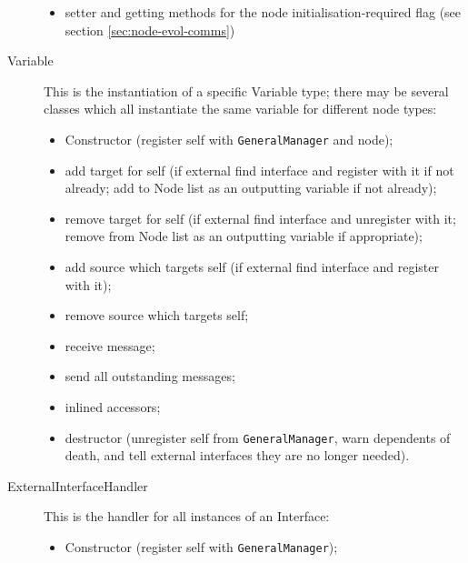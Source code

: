 \documentclass[pdftex,a4paper]{article}
\begin{document}
\begin{description}
\begin{itemize}
\item setter and getting methods for the node initialisation-required
  flag (see section \ref{sec:node-evol-comms})

\end{itemize}

\item[Variable] This is the instantiation of a specific Variable type;
there may be several classes which all instantiate the same variable
for different node types:

\begin{itemize}

\item Constructor (register self with {\tt GeneralManager} and node);

\item add target for self (if external find interface and register
  with it if not already; add to Node list as an outputting variable
  if not already);

\item remove target for self (if external find interface and
  unregister with it; remove from Node list as an outputting variable
  if appropriate);

\item add source which targets self (if external find interface and
  register with it);

\item remove source which targets self;

\item receive message;

\item send all outstanding messages;

\item inlined accessors;

\item destructor (unregister self from {\tt GeneralManager}, warn
  dependents of death, and tell external interfaces they are no longer
  needed).

\end{itemize}

\item[ExternalInterfaceHandler] This is the handler for all instances
  of an Interface:

\begin{itemize}

\item Constructor (register self with {\tt GeneralManager});


\end{itemize}
\end{description}
\end{document}

